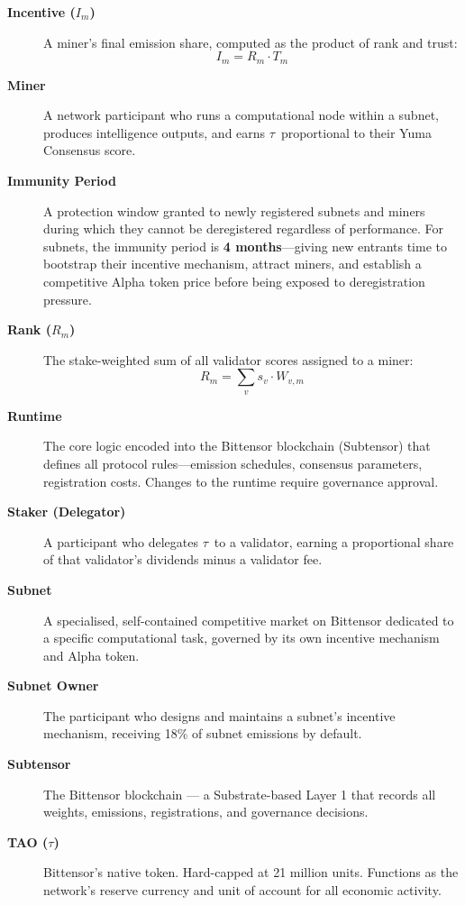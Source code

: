 \documentclass[12pt, a4paper, oneside]{report}
\newcommand{\TAO}{$\tau$}            %
\theoremstyle{definition}
\begin{document}
\begin{description}
  \item[\textbf{Incentive ($I_m$)}] A miner's final emission share, computed 
  as the product of rank and trust:
  \[
    I_m = R_m \cdot T_m
  \]

  \item[\textbf{Miner}] A network participant who runs a computational node 
  within a subnet, produces intelligence outputs, and earns \TAO\ proportional 
  to their Yuma Consensus score.

  \item[\textbf{Immunity Period}] A protection window granted to newly 
  registered subnets and miners during which they cannot be deregistered 
  regardless of performance. For subnets, the immunity period is 
  \textbf{4 months}—giving new entrants time to bootstrap their incentive 
  mechanism, attract miners, and establish a competitive Alpha token price 
  before being exposed to deregistration pressure.

  \item[\textbf{Rank ($R_m$)}] The stake-weighted sum of all validator scores 
  assigned to a miner:
  \[
    R_m = \sum_v s_v \cdot W_{v,m}
  \]

  \item[\textbf{Runtime}] The core logic encoded into the Bittensor blockchain 
  (Subtensor) that defines all protocol rules—emission schedules, consensus 
  parameters, registration costs. Changes to the runtime require governance 
  approval.

  \item[\textbf{Staker (Delegator)}] A participant who delegates \TAO\ to a 
  validator, earning a proportional share of that validator's dividends minus 
  a validator fee.

  \item[\textbf{Subnet}] A specialised, self-contained competitive market on 
  Bittensor dedicated to a specific computational task, governed by its own 
  incentive mechanism and Alpha token.

  \item[\textbf{Subnet Owner}] The participant who designs and maintains a 
  subnet's incentive mechanism, receiving 18\% of subnet emissions by default.

  \item[\textbf{Subtensor}] The Bittensor blockchain — a Substrate-based Layer 1 
  that records all weights, emissions, registrations, and governance decisions.

  \item[\textbf{TAO ($\tau$)}] Bittensor's native token. Hard-capped at 21 
  million units. Functions as the network's reserve currency and unit of 
  account for all economic activity.


\end{description}
\end{document}

